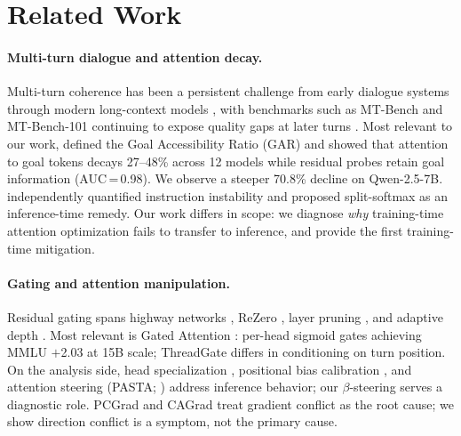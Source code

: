 \section{Related Work}\label{sec:related}

\paragraph{Multi-turn dialogue and attention decay.}
Multi-turn coherence has been a persistent challenge from early dialogue systems \citep{li2016persona,roller2021recipes,zhang2020dialogpt} through modern long-context models \citep{xu2022goldfish}, with benchmarks such as MT-Bench \citep{zheng2024judging} and MT-Bench-101 \citep{bai2024mtbench101} continuing to expose quality gaps at later turns \citep{laban2025lost,liu2026intent}. Most relevant to our work, \citet{dongre2026attention} defined the Goal Accessibility Ratio (GAR) and showed that attention to goal tokens decays 27--48\% across 12 models while residual probes retain goal information (AUC\,=\,0.98). We observe a steeper 70.8\% decline on Qwen-2.5-7B. \citet{li2024measuring} independently quantified instruction instability and proposed split-softmax as an inference-time remedy. Our work differs in scope: we diagnose \emph{why} training-time attention optimization fails to transfer to inference, and provide the first training-time mitigation.

\paragraph{Gating and attention manipulation.}
Residual gating spans highway networks \citep{srivastava2015highway}, ReZero \citep{bachlechner2021rezero}, layer pruning \citep{gromov2024unreasonable,fan2020layerdrop}, and adaptive depth \citep{schuster2022calm,raposo2024mixture}. Most relevant is Gated Attention \citep{qiu2025gated}: per-head sigmoid gates achieving MMLU \citep{hendrycks2021measuring} $+$2.03 at 15B scale; ThreadGate differs in conditioning on turn position. On the analysis side, head specialization \citep{clark2019what,voita2019analyzing,kovaleva2019revealing}, positional bias calibration \citep{liu2024lost,xiao2024streaming}, and attention steering (PASTA; \citealp{zhang2024tell}) address inference behavior; our $\beta$-steering serves a diagnostic role. PCGrad \citep{yu2020pcgrad} and CAGrad \citep{liu2021cagrad} treat gradient conflict as the root cause; we show direction conflict is a symptom, not the primary cause.

